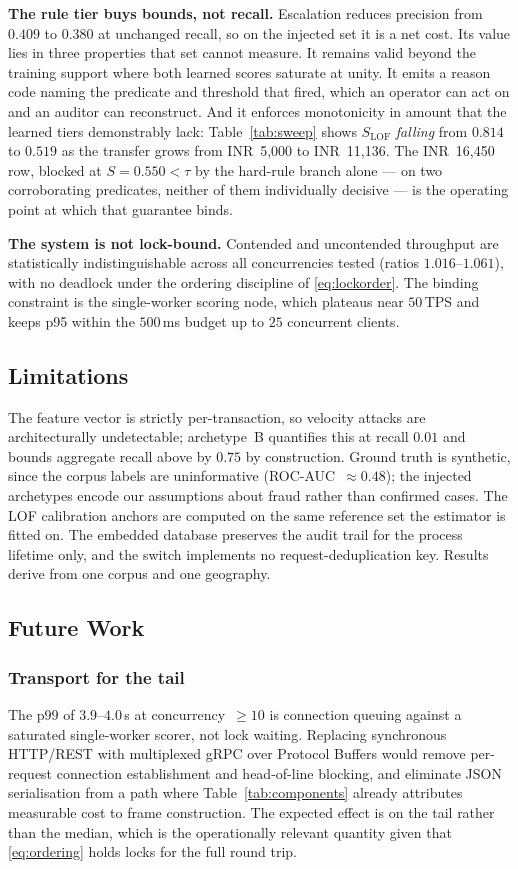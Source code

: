 \documentclass[conference]{IEEEtran}
\newcommand{\INR}[1]{\mbox{INR~#1}}
\begin{document}
\textbf{The rule tier buys bounds, not recall.} Escalation reduces
precision from $0.409$ to $0.380$ at unchanged recall, so on the
injected set it is a net cost. Its value lies in three properties that
set cannot measure. It remains valid beyond the training support where
both learned scores saturate at unity. It emits a reason code naming
the predicate and threshold that fired, which an operator can act on
and an auditor can reconstruct. And it enforces monotonicity in amount
that the learned tiers demonstrably lack: Table~\ref{tab:sweep} shows
$S_{\mathrm{LOF}}$ \emph{falling} from $0.814$ to $0.519$ as the
transfer grows from \INR{5{,}000} to \INR{11{,}136}. The
\INR{16{,}450} row, blocked at $S = 0.550 < \tau$ by the hard-rule
branch alone --- on two corroborating predicates, neither of them
individually decisive --- is the operating point at which that
guarantee binds.

\textbf{The system is not lock-bound.} Contended and uncontended
throughput are statistically indistinguishable across all
concurrencies tested (ratios $1.016$--$1.061$), with no deadlock under
the ordering discipline of \eqref{eq:lockorder}. The binding
constraint is the single-worker scoring node, which plateaus near
$50$\,TPS and keeps p95 within the $500$\,ms budget up to $25$
concurrent clients.

\subsection{Limitations}

The feature vector is strictly per-transaction, so velocity attacks are
architecturally undetectable; archetype~B quantifies this at recall
$0.01$ and bounds aggregate recall above by $0.75$ by construction.
Ground truth is synthetic, since the corpus labels are uninformative
(ROC-AUC~$\approx 0.48$); the injected archetypes encode our
assumptions about fraud rather than confirmed cases. The LOF
calibration anchors are computed on the same reference set the
estimator is fitted on. The embedded database preserves the audit
trail for the process lifetime only, and the switch implements no
request-deduplication key. Results derive from one corpus and one
geography.

\subsection{Future Work}

\subsubsection{Transport for the tail}
The p99 of $3.9$--$4.0$\,s at concurrency~$\geq 10$ is connection
queuing against a saturated single-worker scorer, not lock waiting.
Replacing synchronous HTTP/REST with multiplexed gRPC over Protocol
Buffers would remove per-request connection establishment and head-of-line
blocking, and eliminate JSON serialisation from a path where
Table~\ref{tab:components} already attributes measurable cost to frame
construction. The expected effect is on the tail rather than the
median, which is the operationally relevant quantity given that
\eqref{eq:ordering} holds locks for the full round trip.
\end{document}
